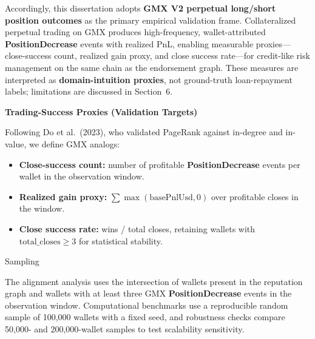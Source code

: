 Accordingly, this dissertation adopts \textbf{GMX V2 perpetual long/short position outcomes} as the primary empirical validation frame. Collateralized perpetual trading on GMX produces high-frequency, wallet-attributed \textbf{PositionDecrease} events with realized PnL, enabling measurable proxies---close-success count, realized gain proxy, and close success rate---for credit-like risk management on the same chain as the endorsement graph. These measures are interpreted as \textbf{domain-intuition proxies}, not ground-truth loan-repayment labels; limitations are discussed in Section~6.


\textbf{Trading-Success Proxies (Validation Targets)}


Following Do et al.\ (2023), who validated PageRank against in-degree and in-value, we define GMX analogs:

\begin{itemize}
\item[\textbullet] \textbf{Close-success count:} number of profitable \textbf{PositionDecrease} events per wallet in the observation window.
\item[\textbullet] \textbf{Realized gain proxy:} $\sum \max(\text{basePnlUsd}, 0)$ over profitable closes in the window.
\item[\textbullet] \textbf{Close success rate:} wins / total closes, retaining wallets with $\text{total\_closes} \geq 3$ for statistical stability.
\end{itemize}


Sampling


The alignment analysis uses the intersection of wallets present in the reputation graph and wallets with at least three GMX \textbf{PositionDecrease} events in the observation window. Computational benchmarks use a reproducible random sample of 100,000 wallets with a fixed seed, and robustness checks compare 50,000- and 200,000-wallet samples to test scalability sensitivity.


